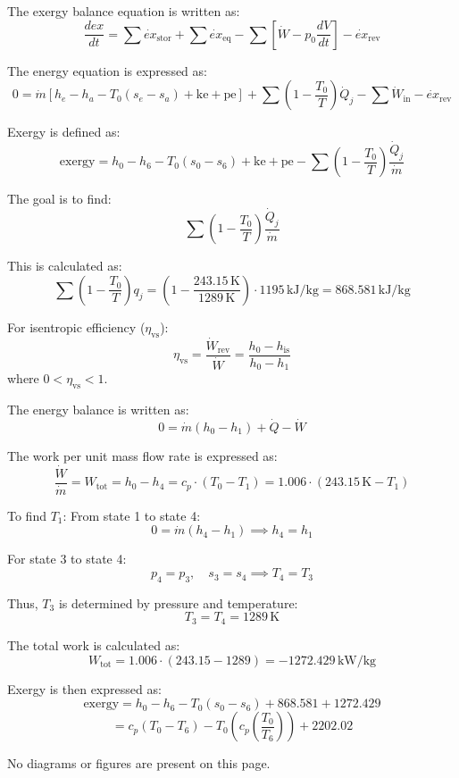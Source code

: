 The exergy balance equation is written as:  
\[
\frac{d ex}{dt} = \sum \dot{ex}_{\text{stor}} + \sum \dot{ex}_{\text{eq}} - \sum \left[ \dot{W} - p_0 \frac{dV}{dt} \right] - \dot{ex}_{\text{rev}}
\]  

The energy equation is expressed as:  
\[
0 = \dot{m} \left[ h_e - h_a - T_0 (s_e - s_a) + \text{ke} + \text{pe} \right] + \sum \left( 1 - \frac{T_0}{T} \right) \dot{Q}_j - \sum \dot{W}_{\text{in}} - \dot{ex}_{\text{rev}}
\]  

Exergy is defined as:  
\[
\text{exergy} = h_0 - h_6 - T_0 (s_0 - s_6) + \text{ke} + \text{pe} - \sum \left( 1 - \frac{T_0}{T} \right) \frac{\dot{Q}_j}{\dot{m}}
\]  

The goal is to find:  
\[
\sum \left( 1 - \frac{T_0}{T} \right) \frac{\dot{Q}_j}{\dot{m}}
\]  

This is calculated as:  
\[
\sum \left( 1 - \frac{T_0}{T} \right) q_j = \left( 1 - \frac{243.15 \, \text{K}}{1289 \, \text{K}} \right) \cdot 1195 \, \text{kJ/kg} = 868.581 \, \text{kJ/kg}
\]  

For isentropic efficiency (\( \eta_{\text{vs}} \)):  
\[
\eta_{\text{vs}} = \frac{\dot{W}_{\text{rev}}}{\dot{W}} = \frac{h_0 - h_{\text{is}}}{h_0 - h_1}
\]  
where \( 0 < \eta_{\text{vs}} < 1 \).  

The energy balance is written as:  
\[
0 = \dot{m} (h_0 - h_1) + \dot{Q} - \dot{W}
\]  

The work per unit mass flow rate is expressed as:  
\[
\frac{\dot{W}}{\dot{m}} = W_{\text{tot}} = h_0 - h_4 = c_p \cdot (T_0 - T_1) = 1.006 \cdot (243.15 \, \text{K} - T_1)
\]  

To find \( T_1 \):  
From state 1 to state 4:  
\[
0 = \dot{m} (h_4 - h_1) \implies h_4 = h_1
\]  

For state 3 to state 4:  
\[
p_4 = p_3, \quad s_3 = s_4 \implies T_4 = T_3
\]  

Thus, \( T_3 \) is determined by pressure and temperature:  
\[
T_3 = T_4 = 1289 \, \text{K}
\]  

The total work is calculated as:  
\[
W_{\text{tot}} = 1.006 \cdot (243.15 - 1289) = -1272.429 \, \text{kW/kg}
\]  

Exergy is then expressed as:  
\[
\text{exergy} = h_0 - h_6 - T_0 (s_0 - s_6) + 868.581 + 1272.429
\]  
\[
= c_p (T_0 - T_6) - T_0 \left( c_p \left( \frac{T_0}{T_6} \right) \right) + 2202.02
\]  

No diagrams or figures are present on this page.